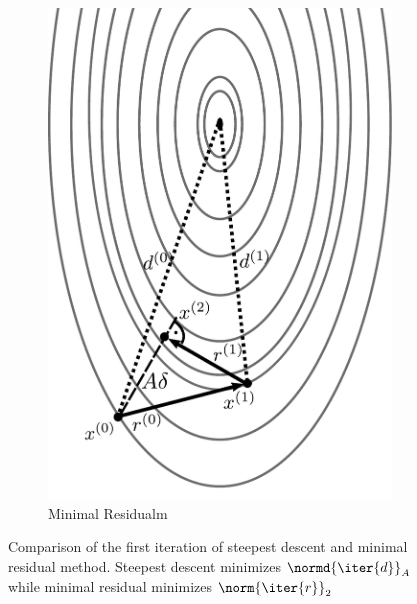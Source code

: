 \begin{figure}
\begin{subfigure}{.5\textwidth}
  \includegraphics[width=0.9\linewidth]{figures/mr.pdf}
  \caption{Minimal Residualm}
  \label{fig:mr}
\end{subfigure}
\caption{Comparison of the first iteration of steepest descent and minimal residual method. Steepest descent minimizes $\normd{\iter{d}}_A$ while minimal residual minimizes $\norm{\iter{r}}_2$}
\label{fig:one_d_projections}
\end{figure}


